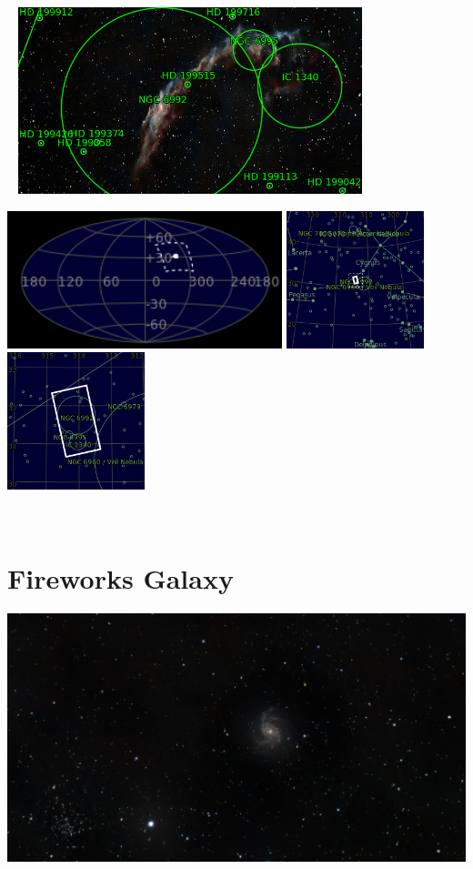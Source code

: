 \begin{center}
 \ \newpage
\includegraphics[width=0.75\textwidth]{../Imaging//Annotated/Eastern_Veil_Nebula_Annotated.jpg}

\includegraphics[height=4cm]{../Imaging//Annotated/Eastern_Veil_Nebula_Globe.jpg}
\includegraphics[height=4cm]{../Imaging//Annotated/Eastern_Veil_Nebula_Close.jpg}
\includegraphics[height=4cm]{../Imaging//Annotated/Eastern_Veil_Nebula_Closer.jpg}
\end{center}
\ \\\section{Fireworks Galaxy}
\includegraphics[width=\textwidth]{../Imaging//Original/Fireworks_Galaxy.jpg}
